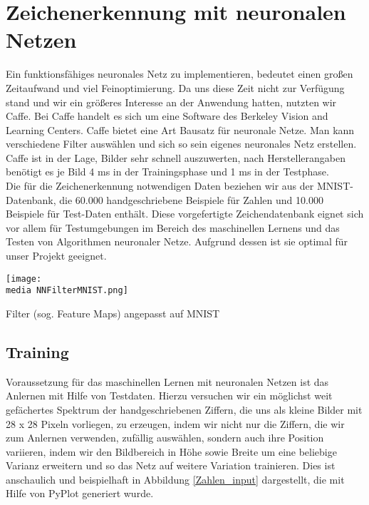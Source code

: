 \section{Zeichenerkennung mit neuronalen Netzen}
Ein funktionsfähiges neuronales Netz zu implementieren, bedeutet einen großen Zeitaufwand und viel Feinoptimierung. Da uns diese Zeit nicht zur Verfügung stand und wir ein größeres Interesse an der Anwendung hatten, nutzten wir Caffe. Bei Caffe handelt es sich um eine Software des Berkeley Vision and Learning Centers. Caffe bietet eine Art Bausatz für neuronale Netze. Man kann verschiedene Filter auswählen und sich so sein eigenes neuronales Netz erstellen. Caffe ist in der Lage, Bilder sehr schnell auszuwerten, nach Herstellerangaben benötigt es je Bild 4 ms in der Trainingsphase und 1 ms in der Testphase. \\
Die für die Zeichenerkennung notwendigen Daten beziehen wir aus der MNIST-Datenbank, die 60.000 handgeschriebene Beispiele für Zahlen und 10.000 Beispiele für Test-Daten enthält. Diese vorgefertigte Zeichendatenbank eignet sich vor allem für Testumgebungen im Bereich des maschinellen Lernens und das Testen von Algorithmen neuronaler Netze. Aufgrund dessen ist sie optimal für unser Projekt geeignet.
\begin{dsafigure}
\begin{center}
	\texttt{[image: \\media NNFilterMNIST.png]}
	\caption{Filter (sog. Feature Maps) angepasst auf MNIST}
	\label{Kameramann}
\end{center}
\end{dsafigure}

\subsection{Training}
Voraussetzung für das maschinellen Lernen mit neuronalen Netzen ist das Anlernen mit Hilfe von Testdaten. Hierzu versuchen wir ein möglichst weit gefächertes Spektrum der handgeschriebenen Ziffern, die uns als kleine Bilder mit 28 x 28 Pixeln vorliegen, zu erzeugen, indem wir nicht nur die Ziffern, die wir zum Anlernen verwenden, zufällig auswählen, sondern auch ihre Position variieren, indem wir den Bildbereich in Höhe sowie Breite um eine beliebige Varianz erweitern und so das Netz auf weitere Variation trainieren. Dies ist anschaulich und beispielhaft in Abbildung \ref{Zahlen_input} dargestellt, die mit Hilfe von PyPlot generiert wurde.\\

